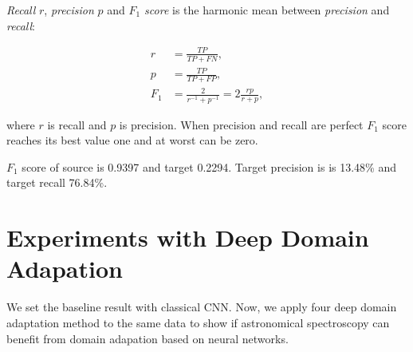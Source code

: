 \textit{Recall} \(r\), \textit{precision} \(p\)
and \textit{\(F_1\) score} is the harmonic mean between \textit{precision} and \textit{recall}:

\begin{align}
	r &= \frac{\mathit{TP}}{\mathit{TP} + \mathit{FN}}, \\
	p &= \frac{\mathit{TP}}{\mathit{TP} + \mathit{FP}}, \\
	F_1 &= \frac{2}{r^{-1} + p^{-1}} = 2 \frac{r p}{r + p},
\end{align}

where \(r\) is recall and \(p\) is precision.
When precision and recall are perfect
\(F_1\) score reaches its best value one and at worst can be zero.

\(F_1\) score of source is 0.9397 and target 0.2294.
Target precision is is 13.48\% and target recall 76.84\%.

\begin{table}
\begin{center}
\end{center}
\end{table}


\section{Experiments with Deep Domain Adapation}

We set the baseline result with classical CNN.
Now, we apply four deep domain adaptation method to the same data
to show if astronomical spectroscopy can benefit from domain adapation
based on neural networks.

